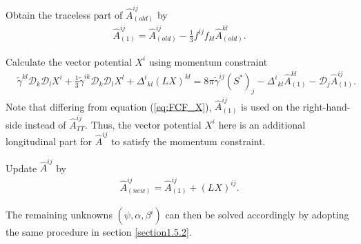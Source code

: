 \begin{Step}
    \item Obtain the traceless part of $\hat{A}^{ij}_{(old)}$ by
    \begin{align}
        \hat{A}^{ij}_{(1)} = \hat{A}^{ij}_{(old)} - \frac{1}{3} f^{ij} f_{kl} \hat{A}^{kl}_{(old)}.
    \end{align}
    \item Calculate the vector potential $X^i$ using momentum constraint
    \begin{align} \label{eq:FCF_X_2}
    &\tilde{\gamma}^{kl} \mathcal{D}_k \mathcal{D}_l X^i + \frac{1}{3}\tilde{\gamma}^{ik}\mathcal{D}_k \mathcal{D}_l X^l
    + \Delta^i{}_{kl} \left( LX \right)^{kl} = 8\pi \tilde{\gamma}^{ij} \left( S^* \right)_j 
    - \Delta^i{}_{kl} \hat{A}^{kl}_{(1)} - \mathcal{D}_j \hat{A}^{ij}_{(1)}.
    \end{align}
    Note that differing from equation (\ref{eq:FCF_X}), $\hat{A}^{ij}_{(1)}$ is used on the right-hand-side instead of $\hat{A}^{ij}_{TT}$.
    Thus, the vector potential $X^i$ here is an additional longitudinal part for $\hat{A}^{ij}$ to satisfy the momentum constraint.
    \item Update $\hat{A}^{ij}$ by
    \begin{align}
        \hat{A}^{ij}_{(new)} = \hat{A}^{ij}_{(1)} + \left( L X \right)^{ij}.
    \end{align}
\end{Step}
The remaining unknowns $\left(\psi, \alpha, \beta^i\right)$ can then be solved accordingly by adopting the same procedure in section \ref{section1.5.2}.

